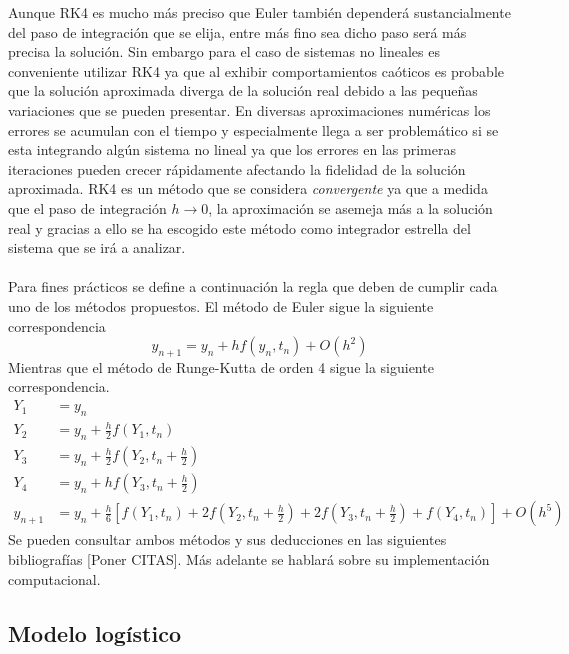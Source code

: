 Aunque RK4 es mucho más preciso que Euler también dependerá sustancialmente del paso de integración que se elija, entre más fino sea dicho paso será más precisa la solución. Sin embargo para el caso de sistemas no lineales es conveniente utilizar RK4 ya que al exhibir comportamientos caóticos es probable que la solución aproximada diverga de la solución real debido a las pequeñas variaciones que se pueden presentar. En diversas aproximaciones numéricas los errores se acumulan con el tiempo y especialmente llega a ser problemático si se esta integrando algún sistema no lineal ya que los errores en las primeras iteraciones pueden crecer rápidamente afectando la fidelidad de la solución aproximada. RK4 es un método que se considera \textit{convergente} ya que a medida que el paso de integración $h\to 0$, la aproximación se asemeja más a la solución real y gracias a ello se ha escogido este método como integrador estrella del sistema que se irá a analizar.\\
\\
Para fines prácticos se define a continuación la regla que deben de cumplir cada uno de los métodos propuestos. El método de Euler sigue la siguiente correspondencia
\begin{equation}\label{eqn:Euler}
	y_{n+1}=y_n+hf(y_n,t_n)+O(h^2)
\end{equation}
Mientras que el método de Runge-Kutta de orden 4 sigue la siguiente correspondencia.
\begin{equation}\label{eqn:RK4}
	\begin{split}
		Y_1 &= y_n\\
		Y_2 &= y_n+\frac{h}{2}f(Y_1,t_n)\\
		Y_3 &= y_n+\frac{h}{2}f\left (Y_2,t_n+\frac{h}{2}\right )\\
		Y_4 &= y_n+hf\left (Y_3,t_n+\frac{h}{2}\right )\\
		y_{n+1} &= y_n+\frac{h}{6}\left [f(Y_1,t_n)+2f\left (Y_2,t_n+\frac{h}{2}\right)+ 2f\left (Y_3,t_n+\frac{h}{2}\right )+f(Y_4,t_n)\right ]+O(h^5)
	\end{split}
\end{equation}
Se pueden consultar ambos métodos y sus deducciones en las siguientes bibliografías [Poner CITAS]. Más adelante se hablará sobre su implementación computacional.

\subsection{Modelo logístico}


